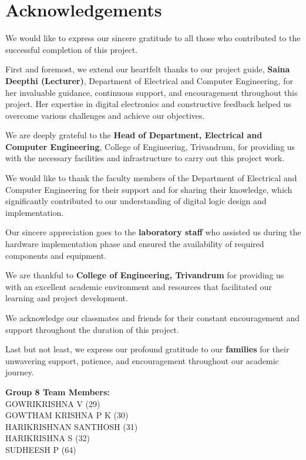 \chapter{Acknowledgements}

We would like to express our sincere gratitude to all those who contributed to the successful completion of this project.

First and foremost, we extend our heartfelt thanks to our project guide, \textbf{Saina Deepthi (Lecturer)}, Department of Electrical and Computer Engineering, for her invaluable guidance, continuous support, and encouragement throughout this project. Her expertise in digital electronics and constructive feedback helped us overcome various challenges and achieve our objectives.

We are deeply grateful to the \textbf{Head of Department, Electrical and Computer Engineering}, College of Engineering, Trivandrum, for providing us with the necessary facilities and infrastructure to carry out this project work.

We would like to thank the faculty members of the Department of Electrical and Computer Engineering for their support and for sharing their knowledge, which significantly contributed to our understanding of digital logic design and implementation.

Our sincere appreciation goes to the \textbf{laboratory staff} who assisted us during the hardware implementation phase and ensured the availability of required components and equipment.

We are thankful to \textbf{College of Engineering, Trivandrum} for providing us with an excellent academic environment and resources that facilitated our learning and project development.

We acknowledge our classmates and friends for their constant encouragement and support throughout the duration of this project.

Last but not least, we express our profound gratitude to our \textbf{families} for their unwavering support, patience, and encouragement throughout our academic journey.

\vspace{2em}

\begin{flushright}
\textbf{Group 8 Team Members:} \\
GOWRIKRISHNA V (29) \\
GOWTHAM KRISHNA P K (30) \\
HARIKRISHNAN SANTHOSH (31) \\
HARIKRISHNA S (32) \\
SUDHEESH P (64)
\end{flushright}